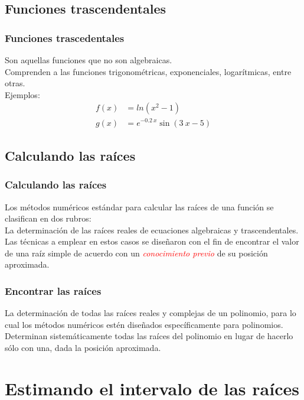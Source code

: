 \subsection{Funciones trascendentales}
\begin{frame}
\frametitle{Funciones trascedentales}
Son aquellas funciones que no son algebraicas.
\\
\bigskip
Comprenden a las funciones trigonométricas, exponenciales, logarítmicas, entre otras.
\\
\bigskip
\pause
Ejemplos:
\begin{align*}
f(x) &= ln(x^{2} - 1) \\[0.5em]
g(x) &= e^{-0.2 \: x} \sin(3 \: x - 5)
\end{align*}
\end{frame}
\subsection{Calculando las raíces}
\begin{frame}
\frametitle{Calculando las raíces}
Los métodos numéricos estándar para calcular las raíces de una función se clasifican en dos rubros:
\\
\bigskip
{} La determinación de las raíces reales de ecuaciones algebraicas y trascendentales.
\\
\bigskip
\pause
Las técnicas a emplear en estos casos se diseñaron con el fin de encontrar el valor de una raíz simple de acuerdo con un \emph{\textcolor{red}{conocimiento previo}} de su posición aproximada.
\end{frame}
\begin{frame}
\frametitle{Encontrar las raíces}
 La determinación de todas las raíces reales y complejas de un polinomio, para lo cual los métodos numéricos estén diseñados específicamente para polinomios. 
\\
\bigskip
\pause
Determinan sistemáticamente todas las raíces del polinomio en lugar de hacerlo sólo con una, dada la posición aproximada.
\end{frame}
\section{Estimando el intervalo de las raíces}

